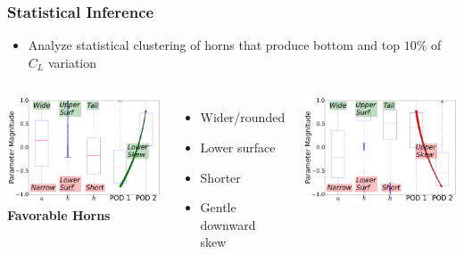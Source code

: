 \documentclass[9pt]{beamer}
\begin{document}
\begin{frame}
\frametitle{Statistical Inference}
\label{sec-3-5}


\begin{itemize}
\item Analyze statistical clustering of horns that produce bottom and top
  $10\%$ of $C_L$ variation
\end{itemize}

\begin{columns}[c]
    \centering
    \includegraphics[width=1\textwidth]{GoodHornParamLocs.png} \\
    {\bf Favorable Horns}
    \begin{itemize}
      \item Wider/rounded
      \item Lower surface
      \item Shorter
      \item Gentle downward skew
    \end{itemize}
    \centering
    \includegraphics[width=1\textwidth]{BadHornParamLocs.png} \\

\end{columns}
\end{frame}
\end{document}
